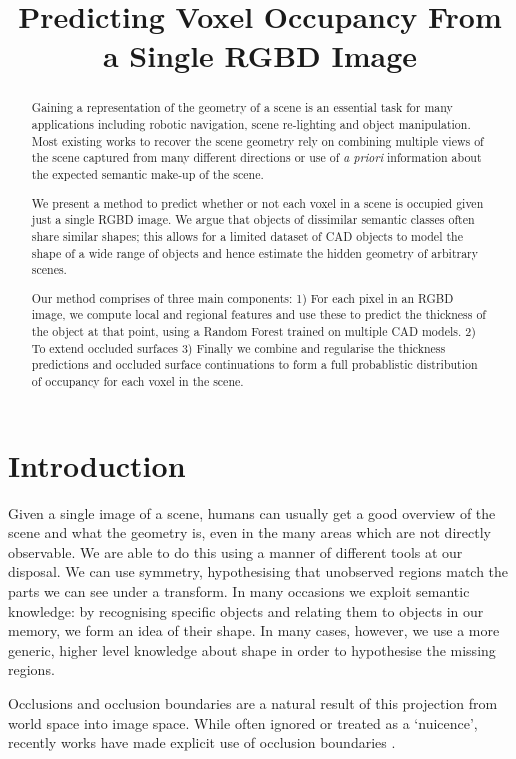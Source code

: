 \documentclass[10pt,twocolumn,letterpaper]{article}
\title{Predicting Voxel Occupancy From a Single RGBD Image}
\begin{document}
\maketitle

\begin{abstract}
	Gaining a representation of the geometry of a scene is an essential task for many applications including robotic navigation, scene re-lighting and object manipulation. 
	Most existing works to recover the scene geometry rely on combining multiple views of the scene captured from many different directions or use of \emph{a priori} information about the expected semantic make-up of the scene.

	We present a method to predict whether or not each voxel in a scene is occupied given just a single RGBD image.
	We argue that objects of dissimilar semantic classes often share similar shapes; this allows for a limited dataset of CAD objects to model the shape of a wide range of objects and hence estimate the hidden geometry of arbitrary scenes.

	Our method comprises of three main components:
	1) For each pixel in an RGBD image, we compute local and regional features and use these to predict the thickness of the object at that point, using a Random Forest trained on multiple CAD models.
	2) To extend occluded surfaces
	3) Finally we combine and regularise the thickness predictions and occluded surface continuations to form a full probablistic distribution of occupancy for each voxel in the scene.
\end{abstract}


\section{Introduction}
Given a single image of a scene, humans can usually get a good overview of the scene and what the geometry is, even in the many areas which are not directly observable. 
We are able to do this using a manner of different tools at our disposal. 
We can use symmetry, hypothesising that unobserved regions match the parts we can see under a transform.
In many occasions we exploit semantic knowledge: by recognising specific objects and relating them to objects in our memory, we form an idea of their shape.
In many cases, however, we use a more generic, higher level knowledge about shape in order to hypothesise the missing regions.

Occlusions and occlusion boundaries are a natural result of this projection from world space into image space.
While often ignored or treated as a `nuicence', recently works have made explicit use of occlusion boundaries \cite{hoiem occlusion boundaires, segmenting simple objects}.
\end{document}

